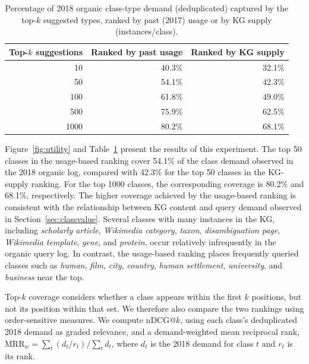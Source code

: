 \documentclass[sw]{iosart2x}
\begin{document}
\begin{table}[ht]
\centering
\caption{Percentage of 2018 organic class-type demand (deduplicated) captured by the top-$k$ suggested types, ranked by past (2017) usage or by KG supply (instances/class).}
\label{tab:utility}
\begin{tabular}{r|r|r}
\hline
Top-$k$ suggestions & Ranked by past usage & Ranked by KG supply \\
\hline
10   & 40.3\% & 32.1\% \\
50   & 54.1\% & 42.3\% \\
100  & 61.8\% & 49.0\% \\
500  & 75.9\% & 62.5\% \\
1000 & 80.2\% & 68.1\% \\
\hline
\end{tabular}
\end{table}

Figure~\ref{fig:utility} and Table~\ref{tab:utility} present the results of this experiment. The top 50 classes in the usage-based ranking cover 54.1\% of the class demand observed in the 2018 organic log, compared with 42.3\% for the top 50 classes in the KG-supply ranking. For the top 1000 classes, the corresponding coverage is 80.2\% and 68.1\%, respectively. The higher coverage achieved by the usage-based ranking is consistent with the relationship between KG content and query demand observed in Section~\ref{sec:classvalue}. Several classes with many instances in the KG, including \emph{scholarly article}, \emph{Wikimedia category}, \emph{taxon}, \emph{disambiguation page}, \emph{Wikimedia template}, \emph{gene}, and \emph{protein}, occur relatively infrequently in the organic query log. In contrast, the usage-based ranking places frequently queried classes such as \emph{human}, \emph{film}, \emph{city}, \emph{country}, \emph{human settlement}, \emph{university}, and \emph{business} near the top.


Top-$k$ coverage considers whether a class appears within the first $k$
positions, but not its position within that set. We therefore also compare the
two rankings using order-sensitive measures. We compute nDCG@$k$, using each
class's deduplicated 2018 demand as graded relevance, and a demand-weighted
mean reciprocal rank,
$\mathrm{MRR}_w = \sum_t (d_t / r_t) / \sum_t d_t$,
where $d_t$ is the 2018 demand for class $t$ and $r_t$ is its rank.
\end{document}
